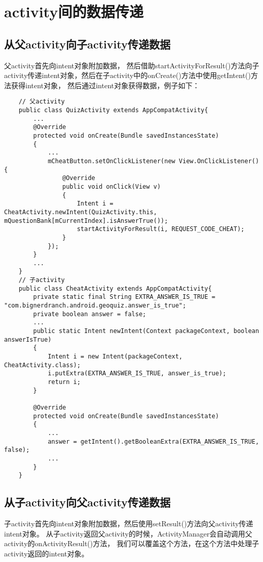 \documentclass[a4paper,left=2.5cm,right=2.5cm,11pt]{article}
\begin{document}


\section{activity间的数据传递}
\subsection{从父activity向子activity传递数据}
	父activity首先向intent对象附加数据，
	然后借助startActivityForResult()方法向子activity传递intent对象，然后在子activity中的onCreate()方法中使用getIntent()方法获得intent对象，
	然后通过intent对象获得数据，例子如下：
	\begin{lstlisting}
	// 父activity
	public class QuizActivity extends AppCompatActivity{
		...
		@Override
		protected void onCreate(Bundle savedInstancesState)
		{
			...
			mCheatButton.setOnClickListener(new View.OnClickListener(){
				@Override
				public void onClick(View v)
				{
					Intent i = CheatActivity.newIntent(QuizActivity.this, mQuestionBank[mCurrentIndex].isAnswerTrue());
					startActivityForResult(i, REQUEST_CODE_CHEAT);
				}
			});
		}
		...
	}
	// 子activity
	public class CheatActivity extends AppCompatActivity{
		private static final String EXTRA_ANSWER_IS_TRUE = "com.bignerdranch.android.geoquiz.answer_is_true";
		private boolean answer = false;
		...
		public static Intent newIntent(Context packageContext, boolean answerIsTrue)
		{
			Intent i = new Intent(packageContext, CheatActivity.class);
			i.putExtra(EXTRA_ANSWER_IS_TRUE, answer_is_true);
			return i;
		}

		@Override
		protected void onCreate(Bundle savedInstancesState)
		{
			...
			answer = getIntent().getBooleanExtra(EXTRA_ANSWER_IS_TRUE, false);
			...
		}
	}
	\end{lstlisting}

\subsection{从子activity向父activity传递数据}
	子activity首先向intent对象附加数据，然后使用setResult()方法向父activity传递intent对象。
	从子activity返回父activity的时候，ActivityManager会自动调用父activity的onActivityResult()方法，
	我们可以覆盖这个方法，在这个方法中处理子activity返回的intent对象。\par
\end{document}
